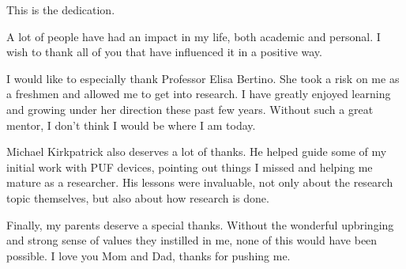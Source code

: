 %
%
%
%
%


\begin{dedication}
  This is the dedication.
\end{dedication}

\begin{acknowledgments}
A lot of people have had an impact in my life, both academic and personal. I wish to thank all of you 
that have influenced it in a positive way.

I would like to especially thank Professor Elisa Bertino. She took a risk on me as a freshmen and allowed 
me to get into research. I have greatly enjoyed learning and growing under her direction these past few 
years. Without such a great mentor, I don't think I would be where I am today.

Michael Kirkpatrick also deserves a lot of thanks. He helped guide some of my initial work with PUF devices,
pointing out things I missed and helping me mature as a researcher. His lessons were invaluable, not
only about the research topic themselves, but also about how research is done.

Finally, my parents deserve a special thanks. Without the wonderful upbringing and strong sense of values 
they instilled in me, none of this would have been possible. I love you Mom and Dad, thanks for pushing
me.

\end{acknowledgments}


